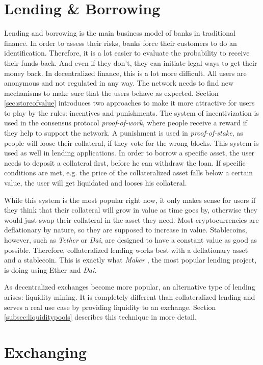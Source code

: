 \section{Lending \& Borrowing}
Lending and borrowing is the main business model of banks in traditional finance. In order to assess their risks, banks force their customers to do an identification. Therefore, it is a lot easier to evaluate the probability to receive their funds back. And even if they don't, they can initiate legal ways to get their money back.
In decentralized finance, this is a lot more difficult. All users are anonymous and not regulated in any way. The network needs to find new mechanisms to make sure that the users behave as expected. Section \ref{sec:storeofvalue} introduces two approaches to make it more attractive for users to play by the rules: incentives and punishments. The system of incentivization is used in the consensus protocol \textit{proof-of-work}, where people receive a reward if they help to support the network. A punishment is used in \textit{proof-of-stake}, as people will loose their collateral, if they vote for the wrong blocks. This system is used as well in lending applications. In order to borrow a specific asset, the user needs to deposit a collateral first, before he can withdraw the loan. If specific conditions are met, e.g. the price of the collateralized asset falls below a certain value, the user will get liquidated and looses his collateral.

While this system is the most popular right now, it only makes sense for users if they think that their collateral will grow in value as time goes by, otherwise
they would just swap their collateral in the asset they need. Most cryptocurrencies are deflationary by nature, so they are supposed to increase in value.
Stablecoins, however, such as \textit{Tether} or \textit{Dai}, are designed to have a constant value as good as possible. Therefore, collateralized lending works best with a
deflationary asset and a stablecoin. This is exactly what \textit{Maker} \cite{MakerDAO2021}, the most popular lending project, is doing using Ether and \textit{Dai}.

As decentralized exchanges become more popular, an alternative type of lending arises: liquidity mining. It is completely different than collateralized lending and
serves a real use case by providing liquidity to an exchange. Section \ref{subsec:liquiditypools} describes this technique in more detail.


\section{Exchanging}
